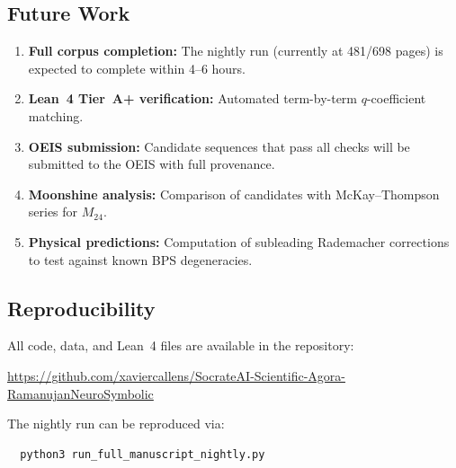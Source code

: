 \subsection{Future Work}

\begin{enumerate}
  \item \textbf{Full corpus completion:} The nightly run
        (currently at 481/698 pages) is expected to
        complete within 4--6 hours.
  \item \textbf{Lean~4 Tier~A+ verification:} Automated
        term-by-term $q$-coefficient matching.
  \item \textbf{OEIS submission:} Candidate sequences
        that pass all checks will be submitted to the
        OEIS with full provenance.
  \item \textbf{Moonshine analysis:} Comparison of
        candidates with McKay--Thompson series for $M_{24}$.
  \item \textbf{Physical predictions:} Computation of
        subleading Rademacher corrections to test
        against known BPS degeneracies.
\end{enumerate}

\subsection{Reproducibility}

All code, data, and Lean~4 files are available in the
repository:
\begin{center}
\url{https://github.com/xaviercallens/SocrateAI-Scientific-Agora-RamanujanNeuroSymbolic}
\end{center}
The nightly run can be reproduced via:
\begin{verbatim}
  python3 run_full_manuscript_nightly.py
\end{verbatim}
